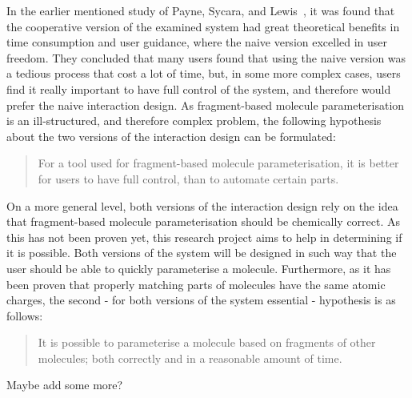 In the earlier mentioned study of Payne, Sycara, and Lewis~\cite{payne2000varying}, it was found that the cooperative version of the examined system had great theoretical benefits in time consumption and user guidance, where the naive version excelled in user freedom. They concluded that many users found that using the naive version was a tedious process that cost a lot of time, but, in some more complex cases, users find it really important to have full control of the system, and therefore would prefer the naive interaction design. As fragment-based molecule parameterisation is an ill-structured, and therefore complex problem, the following hypothesis about the two versions of the interaction design can be formulated:
\begin{quote}
For a tool used for fragment-based molecule parameterisation, it is better for users to have full control, than to automate certain parts.
\end{quote}

On a more general level, both versions of the interaction design rely on the idea that fragment-based molecule parameterisation should be chemically correct. As this has not been proven yet, this research project aims to help in determining if it is possible. Both versions of the system will be designed in such way that the user should be able to quickly parameterise a molecule. Furthermore, as it has been proven that properly matching parts of molecules have the same atomic charges, the second - for both versions of the system essential - hypothesis is as follows:
\begin{quote}
It is possible to parameterise a molecule based on fragments of other molecules; both correctly and in a reasonable amount of time.
\end{quote}

\begin{todo}
\item Maybe add some more?
\end{todo}
